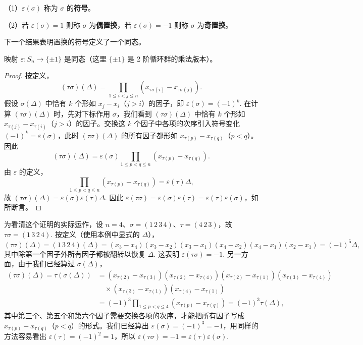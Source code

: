\begin{definition}
（1）\(\varepsilon(\sigma)\) 称为 \(\sigma\) 的\textbf{符号}。

（2）若 \(\varepsilon(\sigma) = 1\) 则称 \(\sigma\) 为\textbf{偶置换}，若 \(\varepsilon(\sigma) = -1\) 则称 \(\sigma\) 为\textbf{奇置换}。
\end{definition}

下一个结果表明置换的符号定义了一个同态。

\begin{proposition}\label{pro:3.23}
映射 \(\varepsilon : S_n \to \{\pm 1\}\) 是同态（这里 \(\{\pm 1\}\) 是 2 阶循环群的乘法版本）。
\end{proposition}

\begin{proof}
按定义，
\[
(\tau\sigma)(\Delta) = \prod_{1 \leq i < j \leq n} (x_{\tau\sigma(i)} - x_{\tau\sigma(j)}).
\]
假设 \(\sigma(\Delta)\) 中恰有 \(k\) 个形如 \(x_j - x_i\)（\(j > i\)）的因子，即 \(\varepsilon(\sigma) = (-1)^k\). 在计算 \((\tau\sigma)(\Delta)\) 时，先对下标作用 \(\sigma\)，我们看到 \((\tau\sigma)(\Delta)\) 中恰有 \(k\) 个形如 \(x_{\tau(j)} - x_{\tau(i)}\)（\(j > i\)）的因子。交换这 \(k\) 个因子中各项的次序引入符号变化 \((-1)^k = \varepsilon(\sigma)\)，此时 \((\tau\sigma)(\Delta)\) 的所有因子都形如 \(x_{\tau(p)} - x_{\tau(q)}\)（\(p < q\)）。因此
\[
(\tau\sigma)(\Delta) = \varepsilon(\sigma) \prod_{1 \leq p < q \leq n} (x_{\tau(p)} - x_{\tau(q)}).
\]
由 \(\varepsilon\) 的定义，
\[
\prod_{1 \leq p < q \leq n} (x_{\tau(p)} - x_{\tau(q)}) = \varepsilon(\tau)\Delta,
\]
故 \((\tau\sigma)(\Delta) = \varepsilon(\sigma)\varepsilon(\tau)\Delta\). 因此 \(\varepsilon(\tau\sigma) = \varepsilon(\sigma)\varepsilon(\tau) = \varepsilon(\tau)\varepsilon(\sigma)\)，如所断言。
\end{proof}

为看清这个证明的实际运作，设 \(n = 4\)、\(\sigma = (1\,2\,3\,4)\)、\(\tau = (4\,2\,3)\)，故 \(\tau\sigma = (1\,3\,2\,4)\). 按定义（使用本例中显式的 \(\Delta\)），
\[
(\tau\sigma)(\Delta) = (1\,3\,2\,4)(\Delta) = (x_3 - x_4)(x_3 - x_2)(x_3 - x_1)(x_4 - x_2)(x_4 - x_1)(x_2 - x_1) = (-1)^5 \Delta,
\]
其中除第一个因子外所有因子都被翻转以恢复 \(\Delta\). 这表明 \(\varepsilon(\tau\sigma) = -1\). 另一方面，由于我们已经算过 \(\sigma(\Delta)\)，
\[
\begin{aligned}
(\tau\sigma)(\Delta) = \tau(\sigma(\Delta)) &= (x_{\tau(2)} - x_{\tau(3)})(x_{\tau(2)} - x_{\tau(4)})(x_{\tau(2)} - x_{\tau(1)})(x_{\tau(3)} - x_{\tau(4)}) \\
&\quad \times (x_{\tau(3)} - x_{\tau(1)})(x_{\tau(4)} - x_{\tau(1)}) \\
&= (-1)^3 \prod_{1 \leq p < q \leq 4} (x_{\tau(p)} - x_{\tau(q)}) = (-1)^3 \tau(\Delta),
\end{aligned}
\]
其中第三个、第五个和第六个因子需要交换各项的次序，才能把所有因子写成 \(x_{\tau(p)} - x_{\tau(q)}\)（\(p < q\)）的形式。我们已经算出 \(\varepsilon(\sigma) = (-1)^3 = -1\)，用同样的方法容易看出 \(\varepsilon(\tau) = (-1)^2 = 1\)，所以 \(\varepsilon(\tau\sigma) = -1 = \varepsilon(\tau)\varepsilon(\sigma)\).

